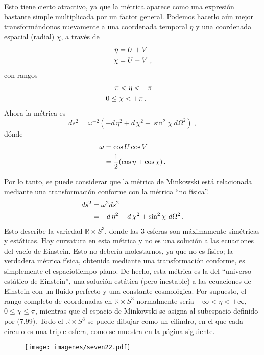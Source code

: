 \documentclass[11pt,b5paper,openany,twoside]{book}
\newcommand{\R}{\mathbb{R}}
\begin{document}
Esto tiene cierto atractivo, ya que la métrica aparece como una expresión bastante simple multiplicada por un factor general.
Podemos hacerlo aún mejor transformándonos nuevamente a una coordenada temporal $\eta$ y una coordenada espacial (radial) $\chi$, a través de
\begin{align}
\eta  &=  U+V \notag \\  \chi  &=  U-V\ ,\label{7.98}
\end{align}
con rangos
\begin{align}
& -\pi< \eta < +\pi &  \notag \\  & 0 \leq \chi < +\pi\,. &
\label{7.99}
\end{align}
Ahora la métrica es
\begin{equation}
ds^2 = \omega^{-2}\left(- d\,\eta^2 +  d\,\chi^2 +\sin^2\chi\
d\Omega^2\right)\ ,\label{7.100}
\end{equation}
dónde
\begin{align}
\omega  &=  \cos U \cos V \notag \\   &=  {1\over 2}
(\cos\eta +\cos\chi)\,.\label{7.101}
\end{align}

Por lo tanto, se puede considerar que la métrica de Minkowski está relacionada mediante una transformación conforme con la métrica ``no física''.
\begin{align}
d\bar{s}^2  &=  \omega^2 ds^2 \notag \\
&=  - d\,\eta^2 +  d\,\chi^2 +\sin^2\chi\ d\Omega^2\,.\label{7.102}
\end{align}
Esto describe la variedad $\R\times S^3$, donde las 3 esferas son máximamente simétricas y estáticas.
Hay curvatura en esta métrica y no es una solución a las ecuaciones del vacío de Einstein.
Esto no debería molestarnos, ya que no es físico; la verdadera métrica física, obtenida mediante una transformación conforme, es simplemente el espaciotiempo plano.
De hecho, esta métrica es la del ``universo estático de Einstein'', una solución estática (pero inestable) a las ecuaciones de Einstein con un fluido perfecto y una constante cosmológica.
Por supuesto, el rango completo de coordenadas en $\R\times S^3$ normalmente sería $-\infty < \eta < +\infty$, $0\leq\chi \leq\pi$, mientras que el espacio de Minkowski se asigna al subespacio definido por (7.99).
Todo el $\R\times S^3$ se puede dibujar como un cilindro, en el que cada círculo es una triple esfera, como se muestra en la página siguiente.

\begin{figure}[h]
\centering
\texttt{[image: imagenes/seven22.pdf]}
\end{figure}
\end{document}
